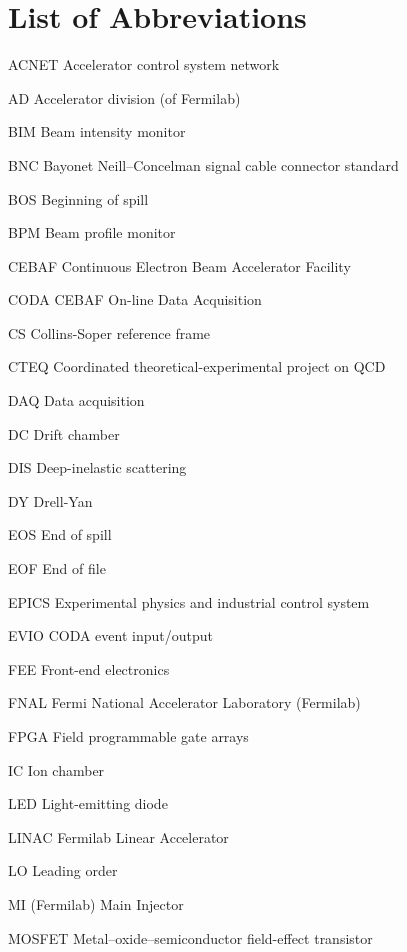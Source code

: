 \documentclass[edeposit,fullpage]{uiucthesis2009}
\begin{document}
\tableofcontents
\listoftables
\listoffigures

\chapter{List of Abbreviations}

\begin{symbollist*}
	\item[ACNET] Accelerator control system network
	\item[AD] Accelerator division (of Fermilab)
	\item[BIM] Beam intensity monitor
	\item[BNC] Bayonet Neill–Concelman signal cable connector standard
	\item[BOS] Beginning of spill
	\item[BPM] Beam profile monitor
	\item[CEBAF] Continuous Electron Beam Accelerator Facility
	\item[CODA] CEBAF On-line Data Acquisition
	\item[CS] Collins-Soper reference frame
	\item[CTEQ] Coordinated theoretical-experimental project on QCD
	\item[DAQ] Data acquisition
	\item[DC] Drift chamber
	\item[DIS] Deep-inelastic scattering
	\item[DY] Drell-Yan
	\item[EOS] End of spill
	\item[EOF] End of file
	\item[EPICS] Experimental physics and industrial control system
	\item[EVIO] CODA event input/output
	\item[FEE] Front-end electronics
	\item[FNAL] Fermi National Accelerator Laboratory (Fermilab)
	\item[FPGA] Field programmable gate arrays
	\item[IC] Ion chamber
	\item[LED] Light-emitting diode
	\item[LINAC] Fermilab Linear Accelerator
	\item[LO] Leading order
	\item[MI] (Fermilab) Main Injector
	\item[MOSFET] Metal–oxide–semiconductor field-effect transistor

\end{symbollist*}
\end{document}
